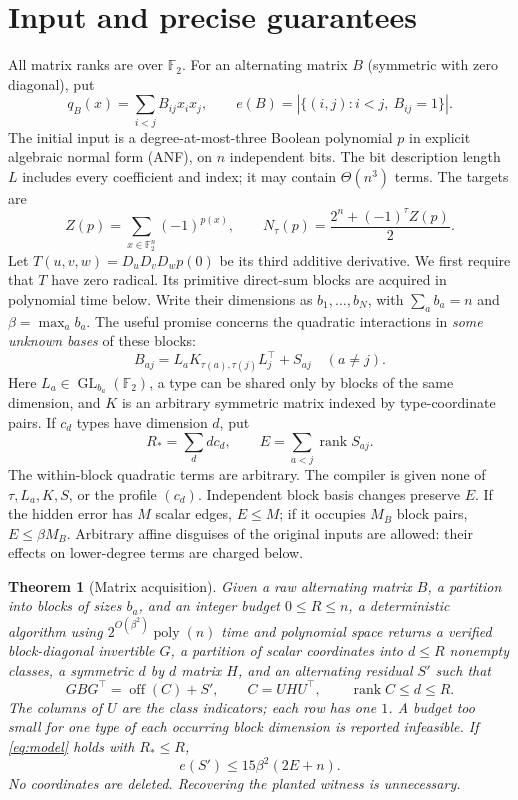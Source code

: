 \documentclass[11pt,a4paper]{article}
\newtheorem{theorem}{Theorem}[section]
\newcommand{\F}{\mathbb F}\newcommand{\Z}{\mathbb Z}
\newcommand{\rank}{\operatorname{rank}}\newcommand{\poly}{\operatorname{poly}}
\newcommand{\off}{\operatorname{off}}\newcommand{\diag}{\operatorname{diag}}
\newcommand{\GL}{\operatorname{GL}}\newcommand{\ham}{\operatorname{Ham}}
\begin{document}
\section{Input and precise guarantees}
\label{sec:results}
All matrix ranks are over $\F_2$. For an alternating matrix $B$
(symmetric with zero diagonal), put
\[
q_B(x)=\sum_{i<j}B_{ij}x_ix_j,\qquad
e(B)=|\{(i,j):i<j,\ B_{ij}=1\}|.
\]
The initial input is a degree-at-most-three Boolean polynomial $p$ in
explicit algebraic normal form (ANF), on $n$ independent bits. The bit
description length $L$ includes every coefficient and index; it may
contain $\Theta(n^3)$ terms. The targets are
\[
Z(p)=\sum_{x\in\F_2^n}(-1)^{p(x)},\qquad
N_\tau(p)=\frac{2^n+(-1)^\tau Z(p)}2.
\]
Let $T(u,v,w)=D_uD_vD_wp(0)$ be its third additive derivative.
We first require that $T$ have zero radical. Its primitive direct-sum
blocks are acquired in polynomial time below. Write their dimensions
as $b_1,\ldots,b_N$, with $\sum_a b_a=n$ and
$\beta=\max_a b_a$. The useful promise concerns the quadratic
interactions in \emph{some unknown bases} of these blocks:
\begin{equation}\label{eq:model}
B_{aj}=L_aK_{\tau(a),\tau(j)}L_j^\top+S_{aj}\quad(a\ne j).
\end{equation}
Here $L_a\in\GL_{b_a}(\F_2)$, a type can be shared only by blocks
of the same dimension, and $K$ is an arbitrary symmetric matrix
indexed by type-coordinate pairs. If $c_d$ types have dimension $d$,
put
\[
R_*=\sum_d d c_d,\qquad E=\sum_{a<j}\rank S_{aj}.
\]
The within-block quadratic terms are arbitrary. The compiler is
given none of $\tau,L_a,K,S$, or the profile $(c_d)$.
Independent block basis changes preserve $E$. If the hidden error
has $M$ scalar edges, $E\le M$; if it occupies $M_B$ block pairs,
$E\le\beta M_B$. Arbitrary affine disguises of the original inputs
are allowed: their effects on lower-degree terms are charged below.

\begin{theorem}[Matrix acquisition]\label{thm:matrix}
Given a raw alternating matrix $B$, a partition into blocks of sizes
$b_a$, and an integer budget $0\le R\le n$, a deterministic algorithm using
$2^{O(\beta^2)}\poly(n)$ time and polynomial space returns a verified
block-diagonal invertible $G$, a partition of scalar coordinates into
$d\le R$ nonempty classes, a symmetric $d$ by $d$ matrix $H$, and an
alternating residual $S'$ such that
\[
GBG^\top=\off(C)+S',\qquad C=UHU^\top,\qquad \rank C\le d\le R.
\]
The columns of $U$ are the class indicators; each row has one $1$.
A budget too small for one type of each occurring block dimension
is reported infeasible. If \eqref{eq:model} holds with $R_*\le R$,
\begin{equation}\label{eq:residual}
e(S')\le15\beta^2(2E+n).
\end{equation}
No coordinates are deleted. Recovering the planted witness is unnecessary.
\end{theorem}
\end{document}
